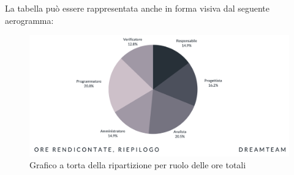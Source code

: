 La tabella può essere rappresentata anche in forma visiva dal seguente aerogramma:
\begin{figure}[H]
\centering
\includegraphics[scale=0.53]{Sezioni/SezioniPreventivo/grafici/Riepilogo_ore_totali_costi.png}
\caption{Grafico a torta della ripartizione per ruolo delle ore totali}
\end{figure}

\pagebreak

